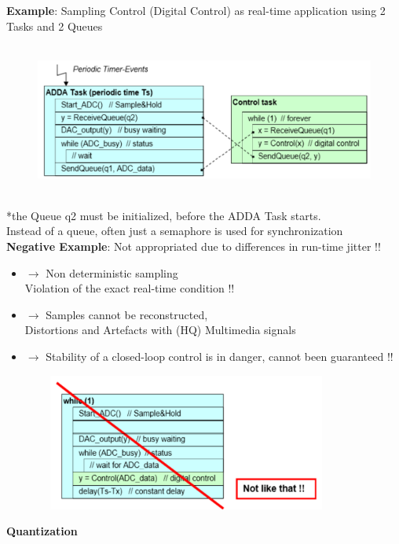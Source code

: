 \textbf{ Example}: Sampling Control (Digital Control) as real-time application using 2 Tasks and 2 Queues

    \begin{figure}[h]
    \centering
    \includegraphics[width=14cm, height=5cm]{Images/image139.png}
    \label{fig:Fig }
    \end{figure}

*the Queue q2 must be initialized, before the ADDA Task starts.\\

Instead of a queue, often just a semaphore is used for synchronization \\

\textbf{Negative Example}: Not appropriated due to differences in run-time  jitter !!

\begin{itemize}
\item $\rightarrow$ Non deterministic sampling \\ Violation of the exact real-time condition !!
\item $\rightarrow$ Samples cannot be reconstructed, \\ Distortions and Artefacts with (HQ) Multimedia signals
\item $\rightarrow$ Stability of a closed-loop control is in danger, cannot been guaranteed !!
\end{itemize}

    \begin{figure}[h]
    \centering
    \includegraphics[width=10cm, height=4.5cm]{Images/image184.png}
    \label{fig:Fig }
    \end{figure}
\newpage
{\rot\bf Quantization}\\

